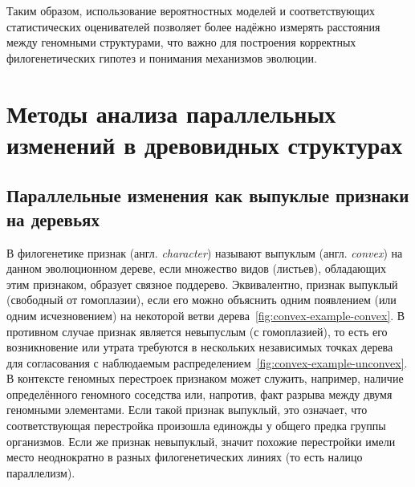 Таким образом, использование вероятностных моделей и соответствующих статистических оценивателей позволяет более надёжно измерять расстояния между геномными структурами, что важно для построения корректных филогенетических гипотез и понимания механизмов эволюции.

\section{Методы анализа параллельных изменений в древовидных структурах}
\label{sec:dirichlet_model}

\subsection{Параллельные изменения как выпуклые признаки на деревьях}
\label{subsec:modified_dcj}

В филогенетике признак (англ. \textit{character}) называют выпуклым (англ. \textit{convex}) на данном эволюционном дереве, если множество видов (листьев), обладающих этим признаком, образует связное поддерево.
Эквивалентно, признак выпуклый (свободный от гомоплазии), если его можно объяснить одним появлением (или одним исчезновением) на некоторой ветви дерева~\ref{fig:convex-example-convex}.
В противном случае признак является невыпуслым (с гомоплазией), то есть его возникновение или утрата требуются в нескольких независимых точках дерева для согласования с наблюдаемым распределением~\ref{fig:convex-example-unconvex}.
В контексте геномных перестроек признаком может служить, например, наличие определённого геномного соседства или, напротив, факт разрыва между двумя геномными элементами.
Если такой признак выпуклый, это означает, что соответствующая перестройка произошла единожды у общего предка группы организмов.
Если же признак невыпуклый, значит похожие перестройки имели место неоднократно в разных филогенетических линиях (то есть налицо параллелизм).

